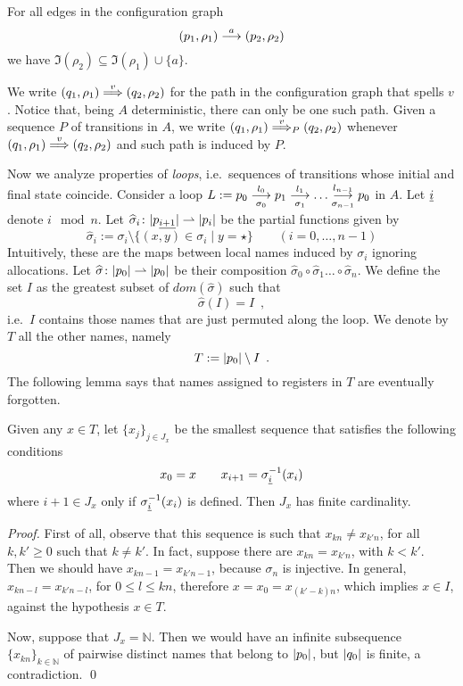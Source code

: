 \begin{lemma}
\label{lem:tr-names}
For all edges in the configuration graph
\[
	(p_1,\rho_1) \overset{a}{\longrightarrow} (p_2,\rho_2) 
\]
we have $\Im(\rho_2) \subseteq \Im(\rho_1) \cup \{ a \}$.
\end{lemma}
%
We write $(q_1,\rho_1) \overset{v}{\Longrightarrow} (q_2,\rho_2)$ for the path in the configuration graph that spells $v$. Notice that, being $A$ deterministic, there can only be one such path. Given a sequence $P$ of transitions in $A$, we write $(q_1,\rho_1) \overset{v}{\Longrightarrow}_{P} (q_2,\rho_2)$ whenever $(q_1,\rho_1) \overset{v}{\Longrightarrow} (q_2,\rho_2)$ and such path is induced by $P$.

Now we analyze properties of \emph{loops}, i.e.\ sequences of transitions whose initial and final state coincide. Consider a loop $L := p_0 \overset{l_0}{\underset{\sigma_0}{\longrightarrow}} p_1 \overset{l_1}{\underset{\sigma_1}{\longrightarrow}} \dots \overset{l_{n-1}}{\underset{\sigma_{n-1}}{\longrightarrow}} p_0$ in $A$. Let ${\underline{i}}$ denote $i \mod n$. Let $\widehat{\sigma}_i \colon |p_{\underline{i+1}}| \rightharpoonup |p_i|$ be the partial functions given by
\[
	\widehat{\sigma}_i := \sigma_i \setminus \{ (x,y) \in \sigma_i \mid y = \star \} 
	\qquad (i=0,\dots,n-1)
\]
Intuitively, these are the maps between local names induced by $\sigma_i$ ignoring allocations. Let $\widehat{\sigma} \colon |p_0| \rightharpoonup |p_0|$ be their composition $\widehat{\sigma}_0 \circ \widehat{\sigma}_1 \dots \circ \widehat{\sigma}_{n}$. We define the set $I$ as the greatest subset of $dom(\widehat{\sigma})$ such that
\[
	\widehat{\sigma}(I) = I \enspace ,
\]
i.e.\ $I$ contains those names that are just permuted along the loop. We denote by $T$ all the other names, namely 
\[
	T := |p_0| \setminus I \enspace .
\]
%
The following lemma says that names assigned to registers in $T$ are eventually forgotten.


\begin{lemma}
\label{lem:rho-forget}
Given any $x \in T$, let $\{x_j\}_{j \in J_x}$ be the smallest sequence that satisfies the following conditions
\[
	x_0 = x \qquad
	x_{i+1} = \sigma_{{\underline{i}}}^{-1}(x_i)
\]
where $i+1 \in J_x$ only if $\sigma_{{\underline{i}}}^{-1}(x_i)$ is defined. Then $J_x$ has finite cardinality.

\end{lemma}
\begin{proof}
First of all, observe that this sequence is such that $x_{kn} \neq x_{k'n}$, for all $k,k' \geq 0$ such that $k \neq k'$. In fact, suppose there are $x_{kn} = x_{k'n}$, with $k < k'$. Then we should have $x_{kn-1} = x_{k'n-1}$, because $\sigma_{n}$ is injective. In general, $x_{kn-l} = x_{k'n-l}$, for $0 \leq l \leq kn$, therefore $x = x_0 = x_{(k'-k)n}$, which implies $x \in I$, against the hypothesis $x \in T$.

Now, suppose that $J_x = \mathbb{N}$. Then we would have an infinite subsequence $\{x_{kn}\}_{k \in \mathbb{N}}$ of pairwise distinct names that belong to $|p_0|$, but $|q_0|$ is finite, a contradiction.
\qed
\end{proof}


